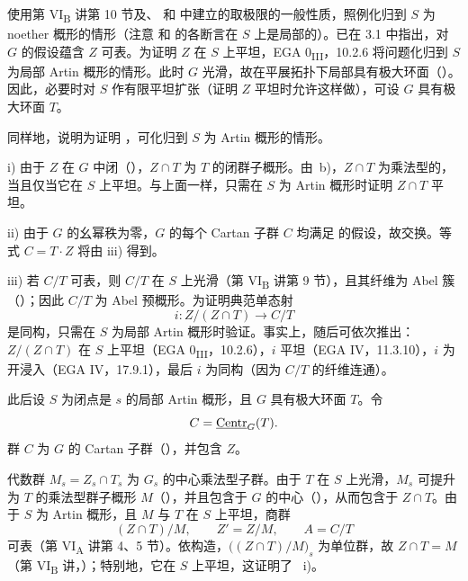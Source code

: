 使用第 VI\textsubscript{B} 讲第 10 节及、 和  中建立的取极限的一般性质，照例化归到 \(S\) 为 noether 概形的情形（注意  和  的各断言在 \(S\) 上是局部的）。已在 3.1 中指出，对 \(G\) 的假设蕴含 \(Z\) 可表。为证明 \(Z\) 在 \(S\) 上平坦，EGA 0\textsubscript{III}，10.2.6 将问题化归到 \(S\) 为局部 Artin 概形的情形。此时 \(G\) 光滑，故在平展拓扑下局部具有极大环面（）。因此，必要时对 \(S\) 作有限平坦扩张（证明 \(Z\) 平坦时允许这样做），可设 \(G\) 具有极大环面 \(T\)。

同样地，说明为证明 ，可化归到 \(S\) 为 Artin 概形的情形。

\medskip
\noindent i) 由于 \(Z\) 在 \(G\) 中闭（），\(Z\cap T\) 为 \(T\) 的闭群子概形。由~b)，\(Z\cap T\) 为乘法型的，当且仅当它在 \(S\) 上平坦。与上面一样，只需在 \(S\) 为 Artin 概形时证明 \(Z\cap T\) 平坦。

\medskip
\noindent ii) 由于 \(G\) 的幺幂秩为零，\(G\) 的每个 Cartan 子群 \(C\) 均满足 的假设，故交换。等式 \(C=T\cdot Z\) 将由 iii) 得到。

\medskip
\noindent iii) 若 \(C/T\) 可表，则 \(C/T\) 在 \(S\) 上光滑（第 VI\textsubscript{B} 讲第 9 节），且其纤维为 Abel 簇（）；因此 \(C/T\) 为 Abel 预概形。为证明典范单态射
\[
  i:Z/(Z\cap T)\longrightarrow C/T
\]
是同构，只需在 \(S\) 为局部 Artin 概形时验证。事实上，随后可依次推出：\(Z/(Z\cap T)\) 在 \(S\) 上平坦（EGA 0\textsubscript{III}，10.2.6），\(i\) 平坦（EGA IV，11.3.10），\(i\) 为开浸入（EGA IV，17.9.1），最后 \(i\) 为同构（因为 \(C/T\) 的纤维连通）。

此后设 \(S\) 为闭点是 \(s\) 的局部 Artin 概形，且 \(G\) 具有极大环面 \(T\)。令
\[
  C=\underline{\operatorname{Centr}}_G(T).
\]
群 \(C\) 为 \(G\) 的 Cartan 子群（），并包含 \(Z\)。

代数群 \(M_s=Z_s\cap T_s\) 为 \(G_s\) 的中心乘法型子群。由于 \(T\) 在 \(S\) 上光滑，\(M_s\) 可提升为 \(T\) 的乘法型群子概形 \(M\)（），并且包含于 \(G\) 的中心（），从而包含于 \(Z\cap T\)。由于 \(S\) 为 Artin 概形，且 \(M\) 与 \(T\) 在 \(S\) 上平坦，商群
\[
  (Z\cap T)/M,\qquad Z'=Z/M,\qquad A=C/T
\]
可表（第 VI\textsubscript{A} 讲第 4、5 节）。依构造，\(\bigl((Z\cap T)/M\bigr)_s\) 为单位群，故 \(Z\cap T=M\)（第 VI\textsubscript{B} 讲，）；特别地，它在 \(S\) 上平坦，这证明了 ~i)。

